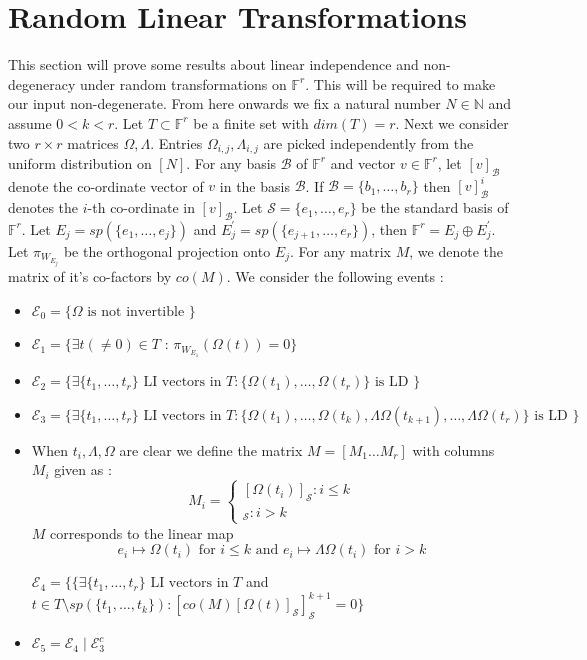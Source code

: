 \documentclass[letterpaper,USenglish,numberwithinsect]{lipics}
\newcommand{\N}{\mathbb{N}}
\newcommand{\F}{\mathbb{F}}
\newcommand{\MB}{\mathcal{B}}
\newcommand{\ME}{\mathcal{E}}
\newcommand{\MS}{\mathcal{S}}
\begin{document}
\section{Random Linear Transformations}\label{randomtransform}
This section will prove some results about linear independence and non-degeneracy under random transformations on $\F^r$. This will be required to make our input non-degenerate. From here onwards we fix a natural number $N\in \N$
and assume $0<k<r$. Let $T\subset \F^r$ be a finite set with $dim(T)= r$. Next
we consider two $r\times r$ matrices $\Omega,\Lambda$. Entries $\Omega_{i,j},\Lambda_{i,j}$
are picked independently from the uniform distribution on $[N]$. For any basis $\MB$ of $\F^r$ and vector $v\in \F^r$, let $[v]_\MB$
denote the co-ordinate vector of $v$ in the basis $\MB$. If $\MB = \{b_1,\ldots,b_r\}$ then $[v]^i_\MB$ denotes the $i$-th co-ordinate in
$[v]_\MB$. Let $\MS = \{e_1,\ldots,e_r\}$ be the standard
basis of $\F^r$. Let $E_j = sp(\{e_1,\ldots,e_j\})$ and $E_j^\prime = sp(\{e_{j+1},\ldots,e_r\})$, then
$\F^r = E_j \oplus E_j^\prime$. Let $\pi_{W_{E_j}}$ be the orthogonal projection onto $E_j$.
For any matrix $M$, we denote the matrix of it's co-factors by $co(M)$.
We consider the following events :

\begin{itemize}
\item $\ME_0 = \{\Omega \text{ is not invertible }\}$
\item $\ME_1 = \{\exists t(\neq 0)\in T$  : $\pi_{W_{E_1}}(\Omega(t))= 0 \}$
\item $\ME_2 = \{ \exists \{t_1,\ldots,t_r\} \text{ LI vectors in }  T : \{\Omega(t_1),\ldots,\Omega(t_r)\} \text{ is LD }\}$
\item $\ME_3 = \{\exists \{t_1,\ldots,t_r\} \text{ LI vectors in }  T : \{\Omega(t_1),\ldots,\Omega(t_k),\Lambda\Omega(t_{k+1}), \ldots , \Lambda\Omega(t_r) \} \text{ is LD } \}$
\item \label{newmatrix} When $t_i,\Lambda,\Omega$ are clear we define the matrix $M =[M_1 \ldots M_r]$
 with columns $M_i$ given as :
\[
   M_i= \left\{
     \begin{array}{lr}
        [\Omega(t_i)]_{\MS} : i\leq k\\

        [\Lambda\Omega(t_i)]_{\MS} : i>k
     \end{array}
   \right.
\]
$M$ corresponds to the linear map
\[
e_i\mapsto \Omega(t_i) \text{ for } i\leq k \text{ and } e_i\mapsto \Lambda\Omega(t_i) \text{ for } i>k
\]

$\ME_4 = \{ \{\exists \{t_1,\ldots,t_r\} \text{ LI vectors in }  T $ and $ t\in T\setminus sp(\{t_1,\ldots,t_k\}) :
[co(M)[\Omega(t)]_{\MS}]^{k+1}_\MS=0 \}$
\item $\ME_5 = \ME_4 \mid \ME_3^c$
\end{itemize}
\end{document}
